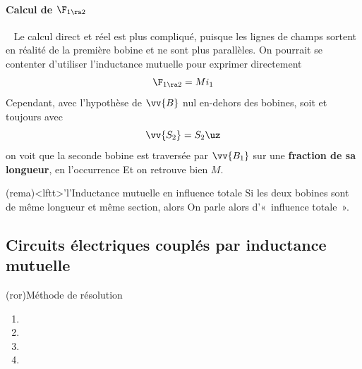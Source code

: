 \documentclass[../../main/main.tex]{subfiles}
\begin{document}
\paragraph*{Calcul de $\F_{1\ra 2}$}~
\smallbreak
\noindent
Le calcul direct et réel est plus compliqué, puisque les lignes de champs
sortent en réalité de la première bobine et ne sont plus parallèles. On
pourrait se contenter d'utiliser l'inductance mutuelle pour exprimer
directement
\[
	\F_{1\ra 2} = Mi_1
\]
Cependant, avec l'hypothèse de $\vv{B}$ nul en-dehors des bobines, soit
\psw{%
	\[
		\vv{B_1} =
		\left\{%
		\begin{array}{lr}
			\DS
			\mu_0 \frac{N_1}{\ell_1}i_1\,\uz & \quad \text{à l'intérieur}
			\\
			\vv{0}                           & \quad \text{à l'extérieur}
		\end{array}
		\right.
	\]
}%
et toujours avec
\[
	\vv{S_2} = S_2\uz
\]
on voit que la seconde bobine est traversée par $\vv{B_1}$ sur une
\textbf{fraction de sa longueur}, en l'occurrence
%
Et on retrouve bien $M$.

\begin{tcb*}(rema)<lftt>'l'{Inductance mutuelle en influence totale}
	Si les deux bobines sont de même longueur et même section, alors
	On parle alors d'«~influence totale~».
\end{tcb*}

\subsection{Circuits électriques couplés par inductance mutuelle}
\label{ssec:inducmutcpl}

\begin{tcb*}(ror){Méthode de résolution}
	\begin{enumerate}
		\item {}%
		\item {}%
		\item {}%
		\item {}%
	\end{enumerate}
\end{tcb*}
\end{document}

